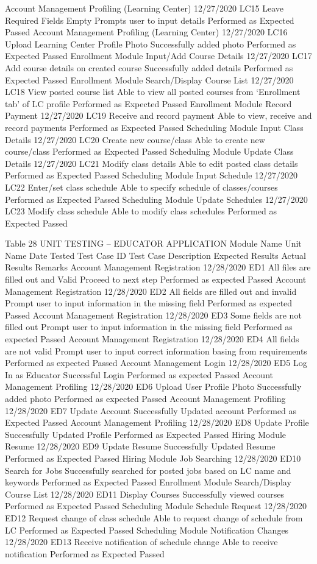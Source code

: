 Account Management	Profiling (Learning Center)	12/27/2020	LC15	Leave Required Fields Empty	Prompts user to input details	Performed as Expected	Passed
Account Management	Profiling (Learning Center)	12/27/2020	LC16	Upload Learning Center Profile Photo	Successfully added photo	Performed as Expected	Passed
Enrollment Module	Input/Add Course Details	12/27/2020	LC17	Add course details on created course	Successfully added details	Performed as Expected	Passed
Enrollment Module	Search/Display Course List	12/27/2020	LC18	View posted course list	Able to view all posted courses from ‘Enrollment tab’ of LC profile	Performed as Expected	Passed
Enrollment Module	Record Payment	12/27/2020	LC19	Receive and record payment	Able to view, receive and record payments	Performed as Expected	Passed
Scheduling Module	Input Class Details	12/27/2020	LC20	Create new course/class	Able to create new course/class	Performed as Expected	Passed
Scheduling Module	Update Class Details	12/27/2020	LC21	Modify class details	Able to edit posted class details	Performed as Expected	Passed
Scheduling Module	Input Schedule	12/27/2020	LC22	Enter/set class schedule	Able to specify schedule of classes/courses	Performed as Expected	Passed
Scheduling Module	Update Schedules	12/27/2020	LC23	Modify class schedule	Able to modify class schedules	Performed as Expected 	Passed


Table 28
UNIT TESTING – EDUCATOR APPLICATION
Module Name	Unit Name	Date Tested	Test Case ID	Test Case Description	Expected Results	Actual Results	Remarks
Account Management	Registration 	12/28/2020	ED1	All files are filled out and Valid	Proceed to next step	Performed as expected	Passed
Account Management	Registration	12/28/2020	ED2	All fields are filled out and invalid	Prompt user to input information in the missing field	Performed as expected	Passed
Account Management	Registration	12/28/2020	ED3	Some fields are not filled out	Prompt user to input information in the missing field	Performed as expected	Passed
Account Management	Registration	12/28/2020	ED4	All fields are not valid	Prompt user to input correct information basing from requirements	Performed as expected	Passed
Account  Management	Login	12/28/2020	ED5	Log In as Educator	Successful Login	Performed as expected	Passed
Account Management	Profiling	12/28/2020	ED6 	Upload User Profile Photo	Successfully added photo	Performed as expected	Passed
Account Management	Profiling	12/28/2020	ED7	Update Account	Successfully Updated account	Performed as Expected	Passed
Account Management	Profiling	12/28/2020	ED8	Update Profile	Successfully Updated Profile	Performed as Expected	Passed
Hiring Module	Resume	12/28/2020	ED9	Update Resume	Successfully Updated Resume	Performed as Expected	Passed
Hiring Module	Job Searching	12/28/2020	ED10	Search for Jobs	Successfully searched for posted jobs based on LC name and keywords	Performed as Expected	Passed
Enrollment Module	Search/Display Course List	12/28/2020	ED11	Display Courses	Successfully viewed courses 	Performed as Expected	Passed
Scheduling Module	Schedule Request	12/28/2020	ED12	Request change of  class schedule	Able to request change of schedule from LC	Performed as Expected	Passed
Scheduling Module	Notification Changes	12/28/2020	ED13	Receive notification of schedule change	Able to receive notification	Performed as Expected	Passed

